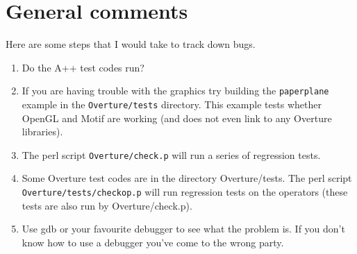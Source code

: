 \documentclass{article}
\begin{document}
\clearpage
\section{General comments}

Here are some steps that I would take to track down bugs.

\begin{enumerate}
  \item Do the A++ test codes run?
  \item If you are having trouble with the graphics try building the {\tt paperplane} example
     in the {\tt Overture/tests} directory. This example tests whether OpenGL and Motif are working (and does
     not even link to any Overture libraries). 
  \item The perl script {\tt Overture/check.p} will run a series of regression tests. 
  \item Some Overture test codes are in the directory Overture/tests. 
        The perl script {\tt Overture/tests/checkop.p} will
        run regression tests on the operators (these tests are also run by Overture/check.p). 
 \item Use gdb or your favourite debugger to see what the problem is. If you don't
    know how to use a debugger you've come to the wrong party.
\end{enumerate}

\clearpage




% 
\end{document}
